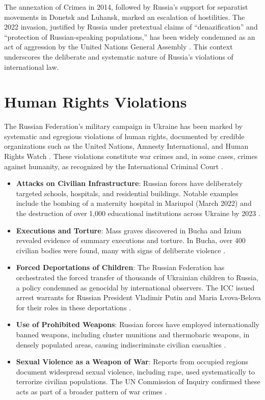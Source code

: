 \documentclass[a4paper,12pt]{article}
\begin{document}
The annexation of Crimea in 2014, followed by Russia’s support for separatist movements in Donetsk and Luhansk, marked an escalation of hostilities. The 2022 invasion, justified by Russia under pretextual claims of “denazification” and “protection of Russian-speaking populations,” has been widely condemned as an act of aggression by the United Nations General Assembly \cite{un_2023}. This context underscores the deliberate and systematic nature of Russia’s violations of international law.

\section{Human Rights Violations}
The Russian Federation’s military campaign in Ukraine has been marked by systematic and egregious violations of human rights, documented by credible organizations such as the United Nations, Amnesty International, and Human Rights Watch \cite{un_2023, amnesty_2022, hrw_2023}. These violations constitute war crimes and, in some cases, crimes against humanity, as recognized by the International Criminal Court \cite{icc_2023}.

\begin{itemize}
    \item \textbf{Attacks on Civilian Infrastructure}: Russian forces have deliberately targeted schools, hospitals, and residential buildings. Notable examples include the bombing of a maternity hospital in Mariupol (March 2022) and the destruction of over 1,000 educational institutions across Ukraine by 2023 \cite{un_2023}.
    \item \textbf{Executions and Torture}: Mass graves discovered in Bucha and Izium revealed evidence of summary executions and torture. In Bucha, over 400 civilian bodies were found, many with signs of deliberate violence \cite{hrw_2023}.
    \item \textbf{Forced Deportations of Children}: The Russian Federation has orchestrated the forced transfer of thousands of Ukrainian children to Russia, a policy condemned as genocidal by international observers. The ICC issued arrest warrants for Russian President Vladimir Putin and Maria Lvova-Belova for their roles in these deportations \cite{icc_2023}.
    \item \textbf{Use of Prohibited Weapons}: Russian forces have employed internationally banned weapons, including cluster munitions and thermobaric weapons, in densely populated areas, causing indiscriminate civilian casualties \cite{amnesty_2022}.
    \item \textbf{Sexual Violence as a Weapon of War}: Reports from occupied regions document widespread sexual violence, including rape, used systematically to terrorize civilian populations. The UN Commission of Inquiry confirmed these acts as part of a broader pattern of war crimes \cite{un_inquiry_2023}.
\end{itemize}
\end{document}
